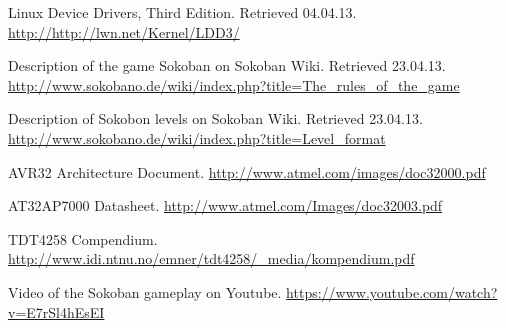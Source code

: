 \documentclass[a4paper,11pt]{article}
\begin{document}
\footnotesize{  %
\begin{thebibliography}{N}
 Linux Device Drivers, Third Edition. Retrieved 04.04.13.
\url{http://http://lwn.net/Kernel/LDD3/}

 Description of the game Sokoban on Sokoban Wiki. Retrieved 23.04.13.
\url{http://www.sokobano.de/wiki/index.php?title=The_rules_of_the_game}

 Description of Sokobon levels on Sokoban Wiki. Retrieved 23.04.13.
\url{http://www.sokobano.de/wiki/index.php?title=Level_format}

 AVR32 Architecture Document.
\url{http://www.atmel.com/images/doc32000.pdf}

 AT32AP7000 Datasheet.
\url{http://www.atmel.com/Images/doc32003.pdf}

 TDT4258 Compendium.
\url{http://www.idi.ntnu.no/emner/tdt4258/_media/kompendium.pdf}

 Video of the Sokoban gameplay on Youtube. \url{https://www.youtube.com/watch?v=E7rSl4hEsEI}

\end{thebibliography}  
}
\end{document}
